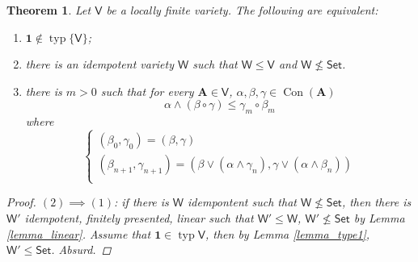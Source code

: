 \documentclass{amsart}
\theoremstyle{plain}
\newtheorem{theorem}{Theorem}[section]
\theoremstyle{definition}
\theoremstyle{remark}
\DeclareMathOperator{\Con}{Con}
\DeclareMathOperator{\typ}{typ}
\begin{document}
\begin{theorem}
    \label{omitting_typ1}
    Let $\mathsf{V}$ be a locally finite variety. 
    The following are equivalent: 
    \begin{enumerate}
        \item $\mathbf{1} \notin \typ\{\mathsf{V}\}$; 
        \item there is an idempotent variety $\mathsf{W}$ such that $\mathsf{W} \le \mathsf{V}$ and $\mathsf{W} \nleq \mathsf{Set}$. 
        \item there is $m > 0$ such that for every $\mathbf{A} \in \mathsf{V}$, $\alpha, \beta, \gamma \in \Con(\mathbf{A})$ 
        \begin{equation*}
            \alpha \land (\beta \circ \gamma) \le \gamma_m \circ \beta_m 
        \end{equation*}
        where 
        \begin{equation*}
        \begin{cases}
            (\beta_0, \gamma_0) = (\beta, \gamma) \\
            (\beta_{n+1}, \gamma_{n+1})  = (\beta \lor (\alpha \land \gamma_n), \gamma \lor (\alpha \land \beta_n)) \\
        \end{cases}
    \end{equation*}
    \end{enumerate}
    \begin{proof}
        $(2) \implies (1)$: if there is $\mathsf{W}$ idempontent such that $\mathsf{W} \nleq \mathsf{Set}$, 
        then there is $\mathsf{W}'$ idempotent, finitely presented, linear such that $\mathsf{W}' \le \mathsf{W}$, $\mathsf{W}' \nleq \mathsf{Set}$ by Lemma \ref{lemma_linear}. 
        Assume that $\mathbf{1} \in \typ{\mathsf{V}}$, then by Lemma \ref{lemma_type1}, $\mathsf{W}' \le \mathsf{Set}$.
        Absurd.  


\end{proof}
\end{theorem}
\end{document}
